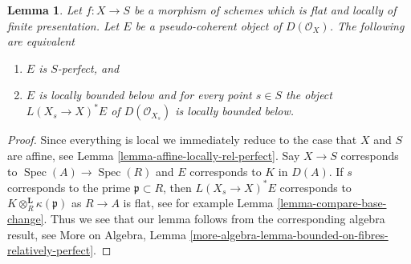 \documentclass{stacks-project}
\theoremstyle{plain}
\newtheorem{lemma}[subsection]{Lemma}
\theoremstyle{definition}
\theoremstyle{remark}
\numberwithin{equation}{subsection}
\def\Spec{\mathop{\mathrm{Spec}}}
\begin{document}
\begin{lemma}
\label{lemma-bounded-on-fibres}
Let $f : X \to S$ be a morphism of schemes which is flat and
locally of finite presentation. Let $E$ be a pseudo-coherent
object of $D(\mathcal{O}_X)$. The following are equivalent
\begin{enumerate}
\item $E$ is $S$-perfect, and
\item $E$ is locally bounded below and for every point $s \in S$
the object $L(X_s \to X)^*E$ of $D(\mathcal{O}_{X_s})$
is locally bounded below.
\end{enumerate}
\end{lemma}

\begin{proof}
Since everything is local we immediately reduce to the
case that $X$ and $S$ are affine, see Lemma
\ref{lemma-affine-locally-rel-perfect}.
Say $X \to S$ corresponds to $\Spec(A) \to \Spec(R)$ and
$E$ corresponds to $K$ in $D(A)$. If $s$ corresponds to
the prime $\mathfrak p \subset R$, then $L(X_s \to X)^*E$
corresponds to $K \otimes_R^\mathbf{L} \kappa(\mathfrak p)$
as $R \to A$ is flat, see for example
Lemma \ref{lemma-compare-base-change}.
Thus we see that our lemma follows from the corresponding algebra
result, see More on Algebra, Lemma
\ref{more-algebra-lemma-bounded-on-fibres-relatively-perfect}.
\end{proof}
\end{document}
